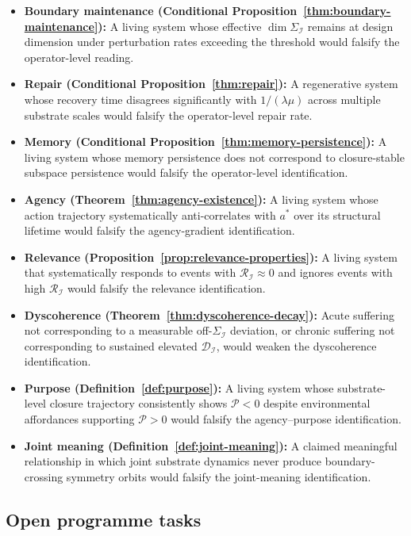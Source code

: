 \documentclass[11pt]{article}
\theoremstyle{plain}
\theoremstyle{definition}
\theoremstyle{remark}
\newcommand{\Ical}{\mathcal{I}}
\newcommand{\Rcal}{\mathcal{R}}
\newcommand{\Dcal}{\mathcal{D}}
\newcommand{\Pcal}{\mathcal{P}}
\begin{document}
\begin{itemize}[leftmargin=2em]
\item \textbf{Boundary maintenance (Conditional Proposition~\ref{thm:boundary-maintenance}):} A living system whose effective $\dim \Sigma_\Ical$ remains at design dimension under perturbation rates exceeding the threshold would falsify the operator-level reading.
\item \textbf{Repair (Conditional Proposition~\ref{thm:repair}):} A regenerative system whose recovery time disagrees significantly with $1/(\lambda \mu)$ across multiple substrate scales would falsify the operator-level repair rate.
\item \textbf{Memory (Conditional Proposition~\ref{thm:memory-persistence}):} A living system whose memory persistence does not correspond to closure-stable subspace persistence would falsify the operator-level identification.
\item \textbf{Agency (Theorem~\ref{thm:agency-existence}):} A living system whose action trajectory systematically anti-correlates with $a^*$ over its structural lifetime would falsify the agency-gradient identification.
\item \textbf{Relevance (Proposition~\ref{prop:relevance-properties}):} A living system that systematically responds to events with $\Rcal_\Ical \approx 0$ and ignores events with high $\Rcal_\Ical$ would falsify the relevance identification.
\item \textbf{Dyscoherence (Theorem~\ref{thm:dyscoherence-decay}):} Acute suffering not corresponding to a measurable off-$\Sigma_\Ical$ deviation, or chronic suffering not corresponding to sustained elevated $\Dcal_\Ical$, would weaken the dyscoherence identification.
\item \textbf{Purpose (Definition~\ref{def:purpose}):} A living system whose substrate-level closure trajectory consistently shows $\Pcal < 0$ despite environmental affordances supporting $\Pcal > 0$ would falsify the agency--purpose identification.
\item \textbf{Joint meaning (Definition~\ref{def:joint-meaning}):} A claimed meaningful relationship in which joint substrate dynamics never produce boundary-crossing symmetry orbits would falsify the joint-meaning identification.
\end{itemize}

\subsection{Open programme tasks}
\end{document}

